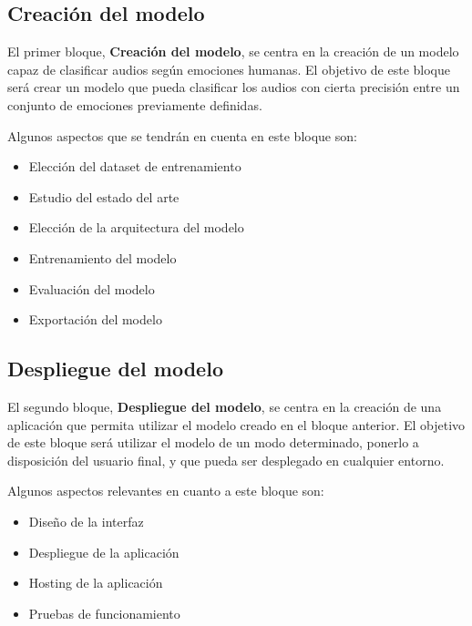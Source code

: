 \medskip

\subsection{Creación del modelo}\label{sec:diseno-modelo}

El primer bloque, \textbf{Creación del modelo}, se centra en la creación de un modelo capaz de clasificar audios según emociones humanas.
El objetivo de este bloque será crear un modelo que pueda clasificar los audios con cierta precisión entre un conjunto de emociones previamente definidas.

Algunos aspectos que se tendrán en cuenta en este bloque son:
\begin{itemize}\itemsep1pt \parskip0pt 
    \item Elección del dataset de entrenamiento
    \item Estudio del estado del arte
    \item Elección de la arquitectura del modelo
    \item Entrenamiento del modelo
    \item Evaluación del modelo
    \item Exportación del modelo
\end{itemize}

\medskip


\subsection{Despliegue del modelo}\label{sec:diseno-despliegue}

El segundo bloque, \textbf{Despliegue del modelo}, se centra en la creación de una aplicación que permita utilizar el modelo creado en el bloque anterior.
El objetivo de este bloque será utilizar el modelo de un modo determinado, ponerlo a disposición del usuario final, y que pueda ser desplegado en cualquier entorno.

Algunos aspectos relevantes en cuanto a este bloque son:

\begin{itemize}\itemsep1pt \parskip0pt 
    \item Diseño de la interfaz
    \item Despliegue de la aplicación
    \item Hosting de la aplicación
    \item Pruebas de funcionamiento
\end{itemize}



\endinput

